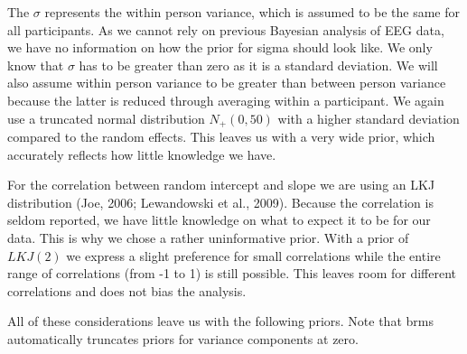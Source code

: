 \documentclass[
  doc,12pt,floatsintext]{apa7}
\begin{document}
The \(\sigma\) represents the within person variance, which is assumed to be the same for all participants. As we cannot rely on previous Bayesian analysis of EEG data, we have no information on how the prior for sigma should look like. We only know that \(\sigma\) has to be greater than zero as it is a standard deviation. We will also assume within person variance to be greater than between person variance because the latter is reduced through averaging within a participant. We again use a truncated normal distribution \(N_+(0, 50)\) with a higher standard deviation compared to the random effects. This leaves us with a very wide prior, which accurately reflects how little knowledge we have.

For the correlation between random intercept and slope we are using an LKJ distribution (Joe, 2006; Lewandowski et al., 2009). Because the correlation is seldom reported, we have little knowledge on what to expect it to be for our data. This is why we chose a rather uninformative prior. With a prior of \(LKJ(2)\) we express a slight preference for small correlations while the entire range of correlations (from -1 to 1) is still possible. This leaves room for different correlations and does not bias the analysis.

All of these considerations leave us with the following priors. Note that brms automatically truncates priors for variance components at zero.
\end{document}
